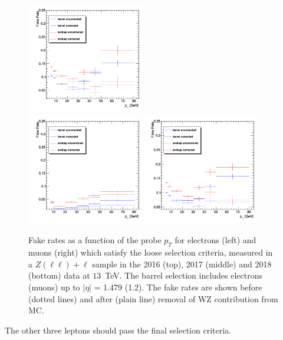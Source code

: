 \begin{figure}[!]
\begin{center}
    {\includegraphics [width=0.45\textwidth] {Figures/RedBkg/FR/FR_OS_muons_2017.png}} \\
    {\includegraphics [width=0.45\textwidth] {Figures/RedBkg/FR/FR_OS_electrons_2018.png}}
    {\includegraphics [width=0.45\textwidth] {Figures/RedBkg/FR/FR_OS_muons_2018.png}} 
\caption{
Fake rates as a function of the probe $p_T$ for  electrons (left) and muons (right) which satisfy the loose selection criteria, measured in
a $Z(\ell\ell)+\ell$ sample in the 2016 (top), 2017 (middle) and 2018 (bottom) data at $13$~TeV.
The barrel selection includes electrons (muons) up to $|\eta|$ = 1.479 (1.2). The fake rates are shown before (dotted lines) and after (plain line) removal of WZ contribution from MC.
}
\label{fig:os_fakerates}
\end{center}
\end{figure}
The other three leptons should pass the final selection criteria. 

